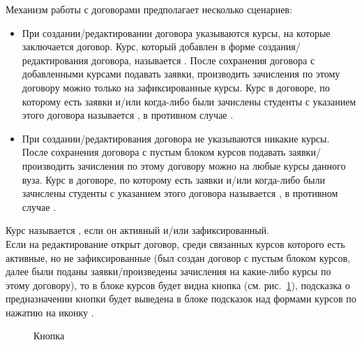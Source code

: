 Механизм работы с договорами предполагает несколько сценариев:
\begin{itemize}
	\item При создании/редактировании договора указываются курсы, на которые заключается договор. Курс, который добавлен в форме создания/редактирования договора, называется . После сохранения договора с добавленными курсами подавать заявки, производить зачисления по этому договору можно только на зафиксированные курсы. Курс в договоре, по которому есть заявки и/или когда-либо были зачислены студенты с указанием этого договора называется , в противном случае .
	\item При создании/редактирования договора не указываются никакие курсы. После сохранения договора с пустым блоком курсов подавать заявки/производить зачисления по этому договору можно на любые курсы данного вуза.  Курс в договоре, по которому есть заявки и/или когда-либо были зачислены студенты с указанием этого договора называется , в противном случае .
\end{itemize}

Курс называется , если он активный и/или зафиксированный. \\
Если на редактирование открыт договор, среди связанных курсов которого есть активные, но не зафиксированные (был создан договор с пустым блоком курсов, далее были поданы заявки/произведены зачисления на какие-либо курсы по этому договору), то в блоке курсов будет видна кнопка  (см. рис.~\ref{agreement:edit_course_fix_button}), подсказка о предназначении кнопки будет выведена в блоке подсказок над формами курсов по нажатию на иконку  .
		
		\begin{figure}[H]
			\caption{Кнопка }
			\label{agreement:edit_course_fix_button}
		\end{figure}	

